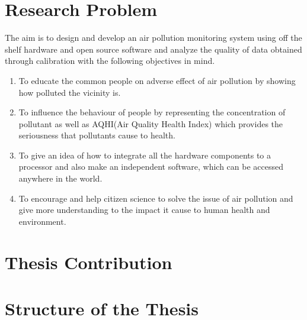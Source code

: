 \section{Research Problem}
The aim is to design and develop an air pollution monitoring system using off the shelf
hardware and open source software and analyze the quality of data obtained through calibration with the following objectives in mind.
\begin{enumerate}
   
    \item To educate the common people on adverse effect of air pollution by showing how polluted
    the vicinity is.
    
    \item To influence the behaviour of people by representing the concentration of pollutant as well
    as AQHI(Air Quality Health Index) which provides the seriousness that pollutants cause
    to health.
    
    \item To give an idea of how to integrate all the hardware components to a processor and also
    make an independent software, which can be accessed anywhere in the world.
    
    \item To encourage and help citizen science to solve the issue of air pollution and give more
    understanding to the impact it cause to human health and environment.

\end{enumerate}


\section{Thesis Contribution}

\section{Structure of the Thesis}
